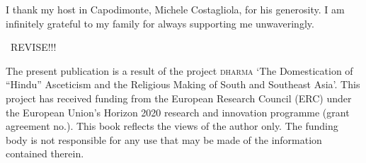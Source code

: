 I thank my host in Capodimonte, Michele Costagliola, for his generosity. 
I am infinitely grateful to my family for always supporting me unwaveringly.

\vspace{2cm}
\noindent

\CHECK\ REVISE!!!

{\footnotesize
The present publication is a result of the project \textsc{dharma} `The
Domestication of ``Hindu'' Asceticism and the Religious Making of South and Southeast Asia'.  This project has received funding from the European Research Council (ERC) under the European Union's Horizon 2020 research and innovation programme (grant agreement no.).  This book reflects the views of the author only.  The funding body is not responsible for any use that
may be made of the information contained therein.}


\vfill
\pagebreak
